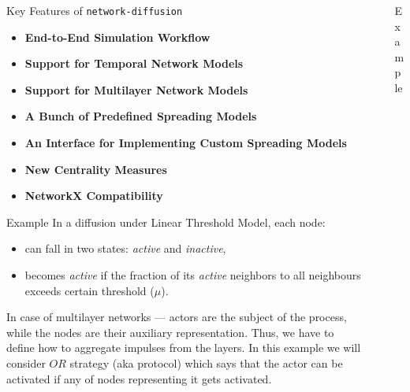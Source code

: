 \documentclass[final]{beamer}
\newlength{\sepwidth}
\newlength{\colwidth}
\newcommand{\separatorcolumn}{\begin{column}{\sepwidth}\end{column}}
\begin{document}
\begin{frame}[t, fragile]
\begin{columns}[t]
\begin{column}{\colwidth}
\begin{block}{Key Features of \lstinline[style=py, basicstyle=\large\ttfamily]{network-diffusion}}
    \begin{itemize}
        \item \textbf{End-to-End Simulation Workflow}
        \item \textbf{Support for Temporal Network Models}
        \item \textbf{Support for Multilayer Network Models}
        \item \textbf{A Bunch of Predefined Spreading Models}
        \item \textbf{An Interface for Implementing Custom Spreading Models}
        \item \textbf{New Centrality Measures}
        \item \textbf{NetworkX Compatibility}
    \end{itemize}
\end{block}

\begin{exampleblock}{Example}
    In a diffusion under Linear Threshold Model, each node:
    \begin{itemize}
        \item can fall in two states: \textit{active} and \textit{inactive},
        \item becomes \textit{active} if the fraction of its \textit{active} neighbors to all 
        neighbours exceeds certain threshold ($\mu$).
    \end{itemize}
    In case of multilayer networks --- actors are the subject of the process, while the 
    nodes are their auxiliary representation. Thus, we have to define how to aggregate impulses 
    from the layers. In this example we will consider $OR$ strategy (aka protocol) which says that
    the actor can be activated if any of nodes representing it gets activated.
\end{exampleblock}

\end{column}

\separatorcolumn
\begin{column}{\colwidth}

\begin{exampleblock}{Example}


\end{exampleblock}
\end{column}
\end{columns}
\end{frame}
\end{document}
